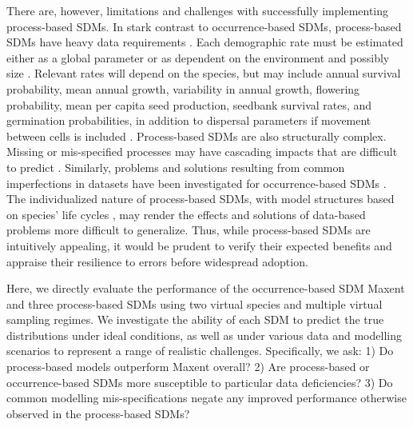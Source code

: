 \documentclass[preprint,review,times,12pt]{elsarticle}
\begin{document}
There are, however, limitations and challenges with successfully implementing process-based SDMs. In stark contrast to occurrence-based SDMs, process-based SDMs have heavy data requirements \citep{Merow2014a,Evans2016}. Each demographic rate must be estimated either as a global parameter or as dependent on the environment and possibly size \citep{Merow2014a,Szewczyk2019}. Relevant rates will depend on the species, but may include annual survival probability, mean annual growth, variability in annual growth, flowering probability, mean per capita seed production, seedbank survival rates, and germination probabilities, in addition to dispersal parameters if movement between cells is included \citep{Merow2011a,Szewczyk2019}. Process-based SDMs are also structurally complex. Missing or mis-specified processes may have cascading impacts that are difficult to predict \citep{Merow2014c}. Similarly, problems and solutions resulting from common imperfections in datasets have been investigated for occurrence-based SDMs \citep{Wisz2008,Boria2014,Merow2016,Fernandes2018}. The individualized nature of process-based SDMs, with model structures based on species' life cycles \citep{Merow2011a,Merow2017,Szewczyk2019}, may render the effects and solutions of data-based problems more difficult to generalize. Thus, while process-based SDMs are intuitively appealing, it would be prudent to verify their expected benefits and appraise their resilience to errors before widespread adoption.

Here, we directly evaluate the performance of the occurrence-based SDM Maxent and three process-based SDMs using two virtual species and multiple virtual sampling regimes. We investigate the ability of each SDM to predict the true distributions under ideal conditions, as well as under various data and modelling scenarios to represent a range of realistic challenges. Specifically, we ask: 1) Do process-based models outperform Maxent overall? 2) Are process-based or occurrence-based SDMs more susceptible to particular data deficiencies? 3) Do common modelling mis-specifications negate any improved performance otherwise observed in the process-based SDMs?
\end{document}
